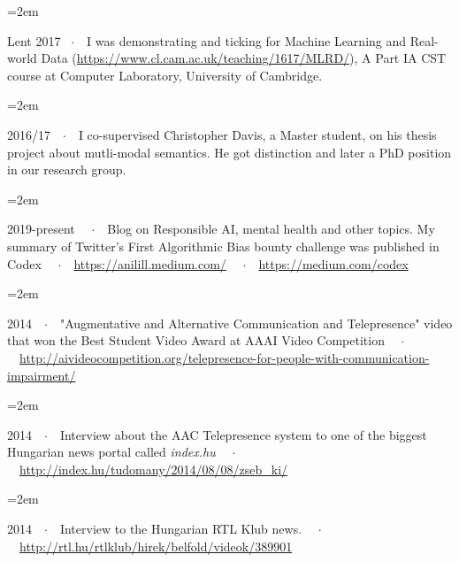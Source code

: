 \documentclass[fontsize=12pt]{scrartcl}
\newcommand{\MarginText}[1]{\marginpar{\raggedleft\itshape\small#1}} %
\newcommand{\Description}[1]{\hangindent=2em\hangafter=0\noindent\raggedright\footnotesize{#1}\par\normalsize\vspace{1em}} %
\begin{document}
\begin{cv}{}
\vspace{-0.5em}

\Description{Lent 2017  \ $\cdotp$\ \ I was demonstrating and ticking for Machine Learning and Real-world Data (\url{https://www.cl.cam.ac.uk/teaching/1617/MLRD/}), A Part IA CST course at Computer Laboratory, University of Cambridge.}

\vspace{-0.5em}

\Description{2016/17\ \ $\cdotp$\ \ I co-supervised Christopher Davis, a Master student, on his thesis project about mutli-modal semantics. He got distinction and later a PhD position in our research group.}

\Description{\MarginText{Media}2019-present \ \ $\cdotp$\ \ Blog on Responsible AI, mental health and other topics. My summary of Twitter's First Algorithmic Bias bounty challenge was published in Codex \ \ $\cdotp$\ \ \url{https://anilill.medium.com/} \ \ $\cdotp$\ \ \url{https://medium.com/codex}}

\vspace{-0.5em} %

\Description{2014\ \ $\cdotp$\ \ "Augmentative and Alternative Communication and Telepresence" video that won the Best Student Video Award at AAAI Video Competition \ \ $\cdotp$\ \ \url{http://aivideocompetition.org/telepresence-for-people-with-communication-impairment/}}

\vspace{-0.5em} %

\Description{2014\ \ $\cdotp$\ \ Interview about the AAC Telepresence system to one of the biggest Hungarian news portal called \textit{index.hu} \ \ $\cdotp$\ \ \url{http://index.hu/tudomany/2014/08/08/zseb_ki/}}

\vspace{-0.5em} %

\Description{2014\ \ $\cdotp$\ \ Interview to the Hungarian RTL Klub news. \ \ $\cdotp$\ \ \url{http://rtl.hu/rtlklub/hirek/belfold/videok/389901}}

\vspace{-0.5em} %


\end{cv}
\end{document}
